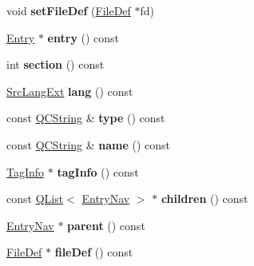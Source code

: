 \begin{DoxyCompactItemize}
\item 
\hypertarget{class_entry_nav_aaf99d2e7b4d7431a00fe3e970bc7f6e8}{void {\bfseries set\-File\-Def} (\hyperlink{class_file_def}{File\-Def} $\ast$fd)}\label{class_entry_nav_aaf99d2e7b4d7431a00fe3e970bc7f6e8}

\item 
\hypertarget{class_entry_nav_aec32fc35e858f7292693597fe189ac25}{\hyperlink{class_entry}{Entry} $\ast$ {\bfseries entry} () const }\label{class_entry_nav_aec32fc35e858f7292693597fe189ac25}

\item 
\hypertarget{class_entry_nav_a809ffcaa201168c4501010c16fb012eb}{int {\bfseries section} () const }\label{class_entry_nav_a809ffcaa201168c4501010c16fb012eb}

\item 
\hypertarget{class_entry_nav_a6851a45596153abed2c99e73b5e69015}{\hyperlink{types_8h_a9974623ce72fc23df5d64426b9178bf2}{Src\-Lang\-Ext} {\bfseries lang} () const }\label{class_entry_nav_a6851a45596153abed2c99e73b5e69015}

\item 
\hypertarget{class_entry_nav_a389bc2d712e8ac443808bda2931cd001}{const \hyperlink{class_q_c_string}{Q\-C\-String} \& {\bfseries type} () const }\label{class_entry_nav_a389bc2d712e8ac443808bda2931cd001}

\item 
\hypertarget{class_entry_nav_a2c310e06c9aadc6fb218f80fcbb5c695}{const \hyperlink{class_q_c_string}{Q\-C\-String} \& {\bfseries name} () const }\label{class_entry_nav_a2c310e06c9aadc6fb218f80fcbb5c695}

\item 
\hypertarget{class_entry_nav_a6aaa67344b770066a14efec5d12d0f3e}{\hyperlink{struct_tag_info}{Tag\-Info} $\ast$ {\bfseries tag\-Info} () const }\label{class_entry_nav_a6aaa67344b770066a14efec5d12d0f3e}

\item 
\hypertarget{class_entry_nav_a1de288573116167a337af9cc7ee40c2a}{const \hyperlink{class_q_list}{Q\-List}$<$ \hyperlink{class_entry_nav}{Entry\-Nav} $>$ $\ast$ {\bfseries children} () const }\label{class_entry_nav_a1de288573116167a337af9cc7ee40c2a}

\item 
\hypertarget{class_entry_nav_a49d6e5d92c9080740183f50c74081402}{\hyperlink{class_entry_nav}{Entry\-Nav} $\ast$ {\bfseries parent} () const }\label{class_entry_nav_a49d6e5d92c9080740183f50c74081402}

\item 
\hypertarget{class_entry_nav_af8f927f77e7ab9ec6d052e73731e0810}{\hyperlink{class_file_def}{File\-Def} $\ast$ {\bfseries file\-Def} () const }\label{class_entry_nav_af8f927f77e7ab9ec6d052e73731e0810}

\end{DoxyCompactItemize}


